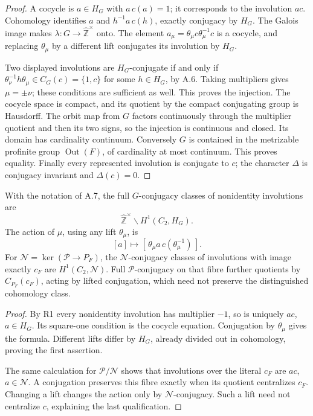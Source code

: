\begin{proof}
A cocycle is \(a\in H_G\) with \(a\,c(a)=1\); it
corresponds to the involution \(ac\). Cohomology
identifies \(a\) and \(h^{-1}a\,c(h)\), exactly
conjugacy by \(H_G\). The Galois image makes
\(\lambda:G\to\widehat{\mathbb Z}^{\times}\) onto.
The element \(a_\mu=\theta_\mu c\theta_\mu^{-1}c\)
is a cocycle, and replacing \(\theta_\mu\) by a
different lift conjugates its involution by \(H_G\).

Two displayed involutions are \(H_G\)-conjugate
if and only if
\(\theta_\nu^{-1}h\theta_\mu\in C_G(c)=\{1,c\}\)
for some \(h\in H_G\), by A.6. Taking multipliers
gives \(\mu=\pm\nu\); these conditions are sufficient
as well. This proves the injection.
The cocycle space is compact, and its quotient by
the compact conjugating group is Hausdorff.
The orbit map from \(G\) factors continuously
through the multiplier quotient and then its
two signs, so the injection is continuous and closed.
Its domain has cardinality continuum. Conversely
\(G\) is contained in the metrizable profinite group
\(\operatorname{Out}(F)\), of cardinality at most
continuum. This proves equality.
Finally every represented involution is conjugate
to \(c\); the character \(\Delta\) is conjugacy
invariant and \(\Delta(c)=0\).
\end{proof}

With the notation of A.7, the full \(G\)-conjugacy
classes of nonidentity involutions are
\[
 \widehat{\mathbb Z}^{\times}\backslash H^1(C_2,H_G).
\]
The action of \(\mu\), using any lift \(\theta_\mu\), is
\[
 [a]\longmapsto[\,\theta_\mu a\,c(\theta_\mu^{-1})\,].
\]
For \(\mathcal N=\ker(\mathcal P\to P_F)\), the
\(\mathcal N\)-conjugacy classes of involutions with
image exactly \(c_F\) are \(H^1(C_2,\mathcal N)\).
Full \(\mathcal P\)-conjugacy on that fibre further
quotients by \(C_{P_F}(c_F)\), acting by lifted
conjugation, which need not preserve the distinguished
cohomology class.

\begin{proof}
By R1 every nonidentity involution has multiplier
\(-1\), so is uniquely \(ac\), \(a\in H_G\).
Its square-one condition is the cocycle equation.
Conjugation by \(\theta_\mu\) gives the formula.
Different lifts differ by \(H_G\), already divided
out in cohomology, proving the first assertion.

The same calculation for \(\mathcal P/\mathcal N\)
shows that involutions over the literal \(c_F\)
are \(ac\), \(a\in\mathcal N\). A conjugation
preserves this fibre exactly when its quotient
centralizes \(c_F\). Changing a lift changes
the action only by \(\mathcal N\)-conjugacy.
Such a lift need not centralize \(c\), explaining
the last qualification.
\end{proof}


